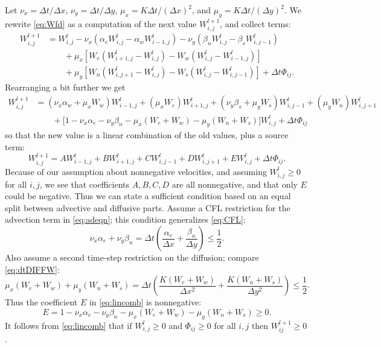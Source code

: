 \documentclass[11pt,final]{amsart}%
\newcommand{\Wlij}{W^l_{i,j}}
\begin{document}
Let $\nu_x = \Delta t/\Delta x$, $\nu_y = \Delta t/\Delta y$, $\mu_x = K \Delta t / (\Delta x)^2$, and $\mu_y = K \Delta t / (\Delta y)^2$.  We rewrite \eqref{eq:Wfd} as a computation of the next value $W_{i,j}^{l+1}$, and collect terms:
\begin{align*}
 W_{i,j}^{l+1} &= \Wlij - \nu_x \left(\alpha_e \Wlij - \alpha_w W_{i-1,j}^l\right) - \nu_y \left(\beta_n \Wlij - \beta_s W_{i,j-1}^l\right)  \\
      &\qquad + \mu_x \left[W_e \left(W_{i+1,j}^l - \Wlij\right) - W_w \left(\Wlij - W_{i-1,j}^l\right)\right]  \\
      &\qquad + \mu_y \left[W_n \left(W_{i,j+1}^l - \Wlij\right) - W_s \left(\Wlij - W_{i,j-1}^l\right)\right] + \Delta t \Phi_{ij}.
\end{align*}
Rearranging a bit further we get
\begin{align*}
 W_{i,j}^{l+1} &= (\nu_x \alpha_w + \mu_x W_w) W_{i-1,j}^l + (\mu_x W_e) W_{i+1,j}^l + (\nu_y \beta_s + \mu_y W_s) W_{i,j-1}^l + (\mu_y W_n) W_{i,j+1}^l \\
      &\qquad + \Big[1 - \nu_x \alpha_e - \nu_y \beta_n - \mu_x (W_e + W_w) - \mu_y (W_n + W_s)\Big] \Wlij + \Delta t \Phi_{ij}
\end{align*}
so that the new value is a linear combination of the old values, plus a source term:
\begin{equation}
W_{i,j}^{l+1} = A W_{i-1,j}^l + B W_{i+1,j}^l + C W_{i,j-1}^l + D W_{i,j+1}^l + E \Wlij + \Delta t \Phi_{ij}. \label{eq:lincomb}
\end{equation}
Because of our assumption about nonnegative velocities, and assuming $\Wlij \ge 0$ for all $i,j$, we see that coefficients $A,B,C,D$ are all nonnegative, and that only $E$ could be negative.  Thus we can state a sufficient condition based on an equal split between advective and diffusive parts.  Assume a CFL restriction for the advection term in \eqref{eq:adeqn}; this condition generalizes \eqref{eq:CFL}:
\begin{equation}
\nu_x \alpha_e + \nu_y \beta_n = \Delta t \left(\frac{\alpha_e}{\Delta x} + \frac{\beta_n}{\Delta y}\right) \le \frac{1}{2}. \label{eq:adstabcond}
\end{equation}
Also assume a second time-step restriction on the diffusion; compare \eqref{eq:dtDIFFW}:
\begin{equation}
\mu_x (W_e + W_w) + \mu_y (W_n + W_s) = \Delta t \left(\frac{K(W_e + W_w)}{\Delta x^2} + \frac{K(W_n + W_s)}{\Delta y^2}\right) \le \frac{1}{2}. \label{eq:diffstabcond}
\end{equation}
Thus the coefficient $E$ in \eqref{eq:lincomb} is nonnegative:
	$$E = 1 - \nu_x \alpha_e - \nu_y \beta_n - \mu_x (W_e + W_w) - \mu_y (W_n + W_s) \ge 0.$$
It follows from \eqref{eq:lincomb} that if $\Wlij\ge 0$ and $\Phi_{ij}\ge 0$ for all $i,j$ then $W_{ij}^{l+1}\ge 0$.
\end{document}
